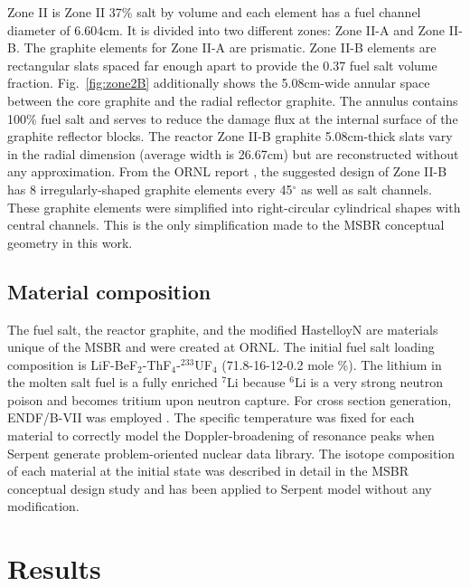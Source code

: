 Zone II is Zone II 37\% salt by volume and each element has a fuel channel 
diameter of 6.604cm. It is divided into two different zones: Zone II-A and Zone 
II-B. The graphite elements for Zone II-A are prismatic. Zone II-B elements are 
rectangular slats spaced far enough apart to provide the 0.37 fuel salt volume 
fraction. Fig.~\ref{fig:zone2B} additionally shows the 5.08cm-wide annular 
space between the core graphite and the radial reflector graphite. The annulus 
contains 100\% fuel salt and serves to reduce the damage flux at the internal 
surface of the graphite reflector blocks. The reactor Zone II-B graphite 
5.08cm-thick slats vary in the radial dimension (average width is 26.67cm) but 
are reconstructed without any approximation. From the ORNL report 
\cite{robertson_conceptual_1971}, the suggested design of Zone II-B has 8 
irregularly-shaped graphite elements every 45$^\circ$ as well as salt channels. 
These graphite elements were simplified into right-circular cylindrical shapes 
with central channels. This is the only simplification made to the \gls{MSBR} 
conceptual geometry in this work.

\subsection{Material composition}
The fuel salt, the reactor graphite, and the modified HastelloyN are materials 
unique of the \gls{MSBR} and were created at \gls{ORNL}. The initial fuel salt 
loading composition is LiF-BeF$_2$-ThF$_4$-$^{233}$UF$_4$ (71.8-16-12-0.2 mole 
\%). The lithium in the molten salt fuel is a fully enriched $^{7}$Li because 
$^{6}$Li is a very strong neutron poison and becomes tritium upon neutron 
capture. For cross section generation, ENDF/B-VII was employed 
\cite{chadwick_endf/b-vii.0:_2006}. The specific temperature was fixed for each 
material to correctly model the Doppler-broadening of resonance peaks when 
Serpent generate problem-oriented nuclear data library.
The isotope composition of each material at the initial state was described in 
detail in the MSBR conceptual design study \cite{robertson_conceptual_1971} 
and has been applied to Serpent model without any modification. %

\section{Results}
